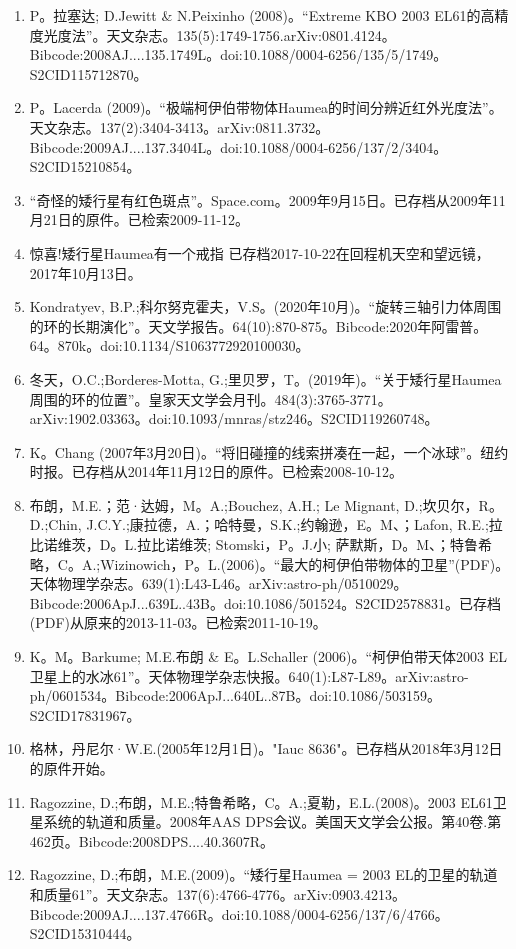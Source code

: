 \begin{enumerate}
\item P。拉塞达; D.Jewitt & N.Peixinho (2008)。“Extreme KBO 2003 EL61的高精度光度法”。天文杂志。135(5):1749-1756.arXiv:0801.4124。Bibcode:2008AJ....135.1749L。doi:10.1088/0004-6256/135/5/1749。S2CID115712870。  
\item P。Lacerda (2009)。“极端柯伊伯带物体Haumea的时间分辨近红外光度法”。天文杂志。137(2):3404-3413。arXiv:0811.3732。Bibcode:2009AJ....137.3404L。doi:10.1088/0004-6256/137/2/3404。S2CID15210854。  
\item “奇怪的矮行星有红色斑点”。Space.com。2009年9月15日。已存档从2009年11月21日的原件。已检索2009-11-12。
\item 惊喜!矮行星Haumea有一个戒指 已存档2017-10-22在回程机天空和望远镜，2017年10月13日。
\item Kondratyev, B.P.;科尔努克霍夫，V.S。(2020年10月)。“旋转三轴引力体周围的环的长期演化”。天文学报告。64(10):870-875。Bibcode:2020年阿雷普。64。870k。doi:10.1134/S1063772920100030。
\item 冬天，O.C.;Borderes-Motta, G.;里贝罗，T。(2019年)。“关于矮行星Haumea周围的环的位置”。皇家天文学会月刊。484(3):3765-3771。arXiv:1902.03363。doi:10.1093/mnras/stz246。S2CID119260748。 
\item K。Chang (2007年3月20日)。“将旧碰撞的线索拼凑在一起，一个冰球”。纽约时报。已存档从2014年11月12日的原件。已检索2008-10-12。
\item 布朗，M.E.；范·达姆，M。A.;Bouchez, A.H.; Le Mignant, D.;坎贝尔，R。D.;Chin, J.C.Y.;康拉德，A.；哈特曼，S.K.;约翰逊，E。M、；Lafon, R.E.;拉比诺维茨，D。L.拉比诺维茨; Stomski，P。J.小; 萨默斯，D。M、；特鲁希略，C。A.;Wizinowich，P。L.(2006)。“最大的柯伊伯带物体的卫星”(PDF)。天体物理学杂志。639(1):L43-L46。arXiv:astro-ph/0510029。Bibcode:2006ApJ...639L..43B。doi:10.1086/501524。S2CID2578831。已存档(PDF)从原来的2013-11-03。已检索2011-10-19。  
\item K。M。Barkume; M.E.布朗 & E。L.Schaller (2006)。“柯伊伯带天体2003 EL卫星上的水冰61”。天体物理学杂志快报。640(1):L87-L89。arXiv:astro-ph/0601534。Bibcode:2006ApJ...640L..87B。doi:10.1086/503159。S2CID17831967。  
\item 格林，丹尼尔·W.E.(2005年12月1日)。"Iauc 8636"。已存档从2018年3月12日的原件开始。
\item Ragozzine, D.;布朗，M.E.;特鲁希略，C。A.;夏勒，E.L.(2008)。2003 EL61卫星系统的轨道和质量。2008年AAS DPS会议。美国天文学会公报。第40卷.第462页。Bibcode:2008DPS....40.3607R。
\item Ragozzine, D.;布朗，M.E.(2009)。“矮行星Haumea = 2003 EL的卫星的轨道和质量61”。天文杂志。137(6):4766-4776。arXiv:0903.4213。Bibcode:2009AJ....137.4766R。doi:10.1088/0004-6256/137/6/4766。S2CID15310444。  

\end{enumerate}
